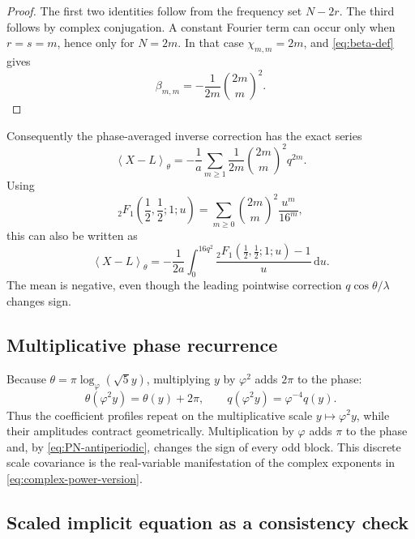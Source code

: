 \documentclass[11pt,oneside]{article}
\numberwithin{equation}{section}
\newcommand{\dd}{\mathrm{d}}
\begin{document}
\begin{proof}
The first two identities follow from the frequency set
\(N-2r\).  The third follows by complex conjugation.  A constant Fourier term
can occur only when \(r=s=m\), hence only for \(N=2m\).  In that case
\(\chi_{m,m}=2m\), and \cref{eq:beta-def} gives
\begin{equation}
  \beta_{m,m}=-\frac1{2m}\binom{2m}{m}^2.
\end{equation}
\end{proof}

Consequently the phase-averaged inverse correction has the exact series
\begin{equation}
  \left\langle X-L\right\rangle_\theta
  =-\frac1a\sum_{m\ge1}\frac1{2m}\binom{2m}{m}^2q^{2m}.
  \label{eq:mean-correction}
\end{equation}
Using
\begin{equation}
  {}_2F_1\!\left(\frac12,\frac12;1;u\right)
  =\sum_{m\ge0}\binom{2m}{m}^2\frac{u^m}{16^m},
\end{equation}
this can also be written as
\begin{equation}
  \left\langle X-L\right\rangle_\theta
  =-\frac1{2a}\int_0^{16q^2}
  \frac{{}_2F_1(\frac12,\frac12;1;u)-1}{u}\,\dd u.
  \label{eq:mean-hypergeometric}
\end{equation}
The mean is negative, even though the leading pointwise correction
\(q\cos\theta/\lambda\) changes sign.

\subsection{Multiplicative phase recurrence}

Because \(\theta=\pi\log_\varphi(\sqrt5y)\), multiplying \(y\) by
\(\varphi^2\) adds \(2\pi\) to the phase:
\begin{equation}
  \theta(\varphi^2y)=\theta(y)+2\pi,
  \qquad
  q(\varphi^2y)=\varphi^{-4}q(y).
  \label{eq:phase-scaling}
\end{equation}
Thus the coefficient profiles repeat on the multiplicative scale
\(y\mapsto\varphi^2y\), while their amplitudes contract geometrically.
Multiplication by \(\varphi\) adds \(\pi\) to the phase and, by
\cref{eq:PN-antiperiodic}, changes the sign of every odd block.
This discrete scale covariance is the real-variable manifestation of the
complex exponents in \cref{eq:complex-power-version}.

\subsection{Scaled implicit equation as a consistency check}
\end{document}

